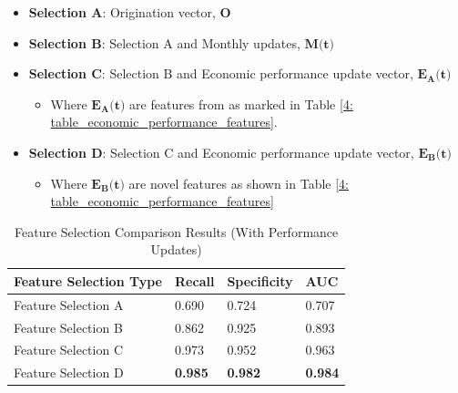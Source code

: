            \begin{itemize}
              \item \textbf{Selection A}: Origination vector, $\textbf{O}$
              \item \textbf{Selection B}: Selection A and Monthly updates, $\textbf{M(t)}$
              \item \textbf{Selection C}: Selection B and Economic performance update vector, $\textbf{$\textbf{$\mathbf{E_{A}}$}$(t)}$
                \begin{itemize}
                    \item Where $\textbf{$\textbf{$\mathbf{E_{A}}$}$(t)}$ are features from \cite{mortgage_risk} as marked in Table \ref{4: table_economic_performance_features}.
                \end{itemize}
              \item \textbf{Selection D}: Selection C and Economic performance update vector, $\textbf{$\textbf{$\mathbf{E_{B}}$}$(t)}$
                \begin{itemize}
                    \item Where $\textbf{$\textbf{$\mathbf{E_{B}}$}$(t)}$ are novel features as shown in Table \ref{4: table_economic_performance_features} 
                \end{itemize}
            \end{itemize}
            
            \begin{table}[H]
                \centering
                \caption{Feature Selection Comparison Results (With Performance Updates)} \vspace{0.5cm}
                \label{5: table_feature_selection }
                    \begin{tabular}{|p{6.5cm}|p{2.5cm}|p{2.5cm}|p{2.5cm}|}
                        \hline \textbf{Feature Selection Type} & \textbf{Recall} & \textbf{Specificity} & \textbf{AUC} \\ \hline \hline
                        Feature Selection A & 0.690 & 0.724 & 0.707 \\ \hline
                        Feature Selection B & 0.862 & 0.925 & 0.893 \\ \hline
                        Feature Selection C & 0.973 & 0.952 & 0.963 \\ \hline
                        Feature Selection D & \textbf{0.985} & \textbf{0.982}  & \textbf{0.984} \\ \hline
                    \end{tabular}
            \end{table}
            
